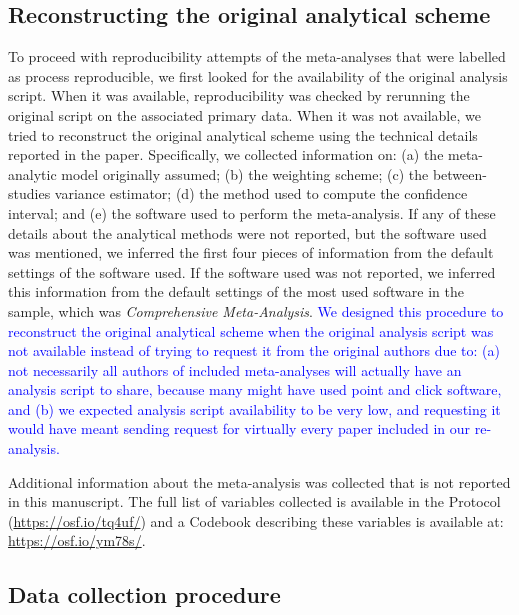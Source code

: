 \documentclass[
  ,man,floatsintext]{apa6}
\begin{document}
\hypertarget{reconstructing-the-original-analytical-scheme}{%
\subsection{Reconstructing the original analytical scheme}\label{reconstructing-the-original-analytical-scheme}}

To proceed with reproducibility attempts of the meta-analyses that were labelled as process reproducible, we first looked for the availability of the original analysis script. When it was available, reproducibility was checked by rerunning the original script on the associated primary data. When it was not available, we tried to reconstruct the original analytical scheme using the technical details reported in the paper. Specifically, we collected information on: (a) the meta-analytic model originally assumed; (b) the weighting scheme; (c) the between-studies variance estimator; (d) the method used to compute the confidence interval; and (e) the software used to perform the meta-analysis. If any of these details about the analytical methods were not reported, but the software used was mentioned, we inferred the first four pieces of information from the default settings of the software used. If the software used was not reported, we inferred this information from the default settings of the most used software in the sample, which was \emph{Comprehensive Meta-Analysis}. \textcolor{blue}{We designed this procedure to reconstruct the original analytical scheme when the original analysis script was not available instead of trying to request it from the original authors due to: (a) not necessarily all authors of included meta-analyses will actually have an analysis script to share, because many might have used point and click software, and (b) we expected analysis script availability to be very low, and requesting it would have meant sending request for virtually every paper included in our re-analysis.}

Additional information about the meta-analysis was collected that is not reported in this manuscript. The full list of variables collected is available in the Protocol (\url{https://osf.io/tq4uf/}) and a Codebook describing these variables is available at: \url{https://osf.io/ym78s/}.

\hypertarget{data-collection-procedure}{%
\subsection{Data collection procedure}\label{data-collection-procedure}}
\end{document}
